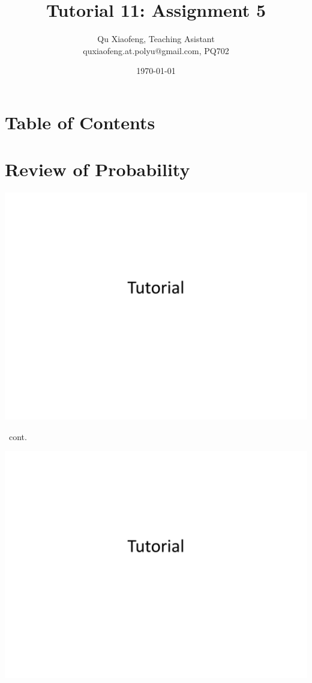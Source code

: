 \documentclass[
        handout,
        ]{beamer}
\title[Tutorial 11]{Tutorial 11: Assignment 5}
\author[COMP210]{Qu Xiaofeng\texorpdfstring{, Teaching Asistant\\\tiny{quxiaofeng.at.polyu@gmail.com, PQ702}}{}}
\institute{COMP210\\Discrete Structure}
\date{\today}
\begin{document}
\frame{\titlepage}

\section*{Table of Contents}

    \begin{frame}{\secname}
        \tableofcontents
    \end{frame}


\section[Review]{Review of Probability}
    \begin{frame}[c,shrink]{\secname}
        \label{review}
        \centerline{\includegraphics[height=0.85\textheight,page=2]{tut_probability}}
    \end{frame}
    
    \begin{frame}[c,shrink]{\secname\ cont.}
        \centerline{\includegraphics[height=0.85\textheight,page=3]{tut_probability}}
    \end{frame}
    
\end{document}
